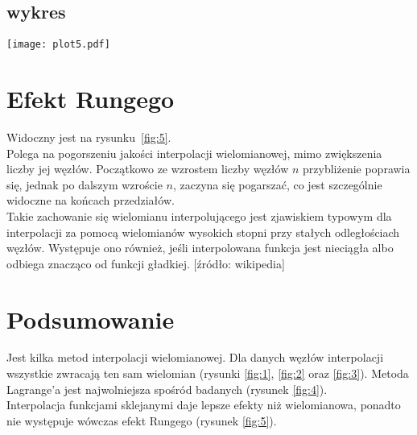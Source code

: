 \subsection{\bf wykres}
\begin{center}
    \texttt{[image: plot5.pdf]}
    \label{fig:5}
\end{center}

\section{\bf Efekt Rungego}
\noindent Widoczny jest na rysunku~\ref{fig:5}.\\
Polega na pogorszeniu jakości interpolacji wielomianowej, mimo 
zwiększenia liczby jej węzłów. Początkowo ze wzrostem liczby węzłów 
$n$ przybliżenie poprawia się, jednak po dalszym wzroście $n$, zaczyna 
się pogarszać, co jest szczególnie widoczne na końcach przedziałów.\\
Takie zachowanie się wielomianu interpolującego jest zjawiskiem typowym 
dla interpolacji za pomocą wielomianów wysokich stopni przy stałych 
odległościach węzłów. Występuje ono również, jeśli interpolowana funkcja
jest nieciągła albo odbiega znacząco od funkcji gładkiej. [źródło: wikipedia]
\clearpage
\section{\bf Podsumowanie}
\noindent Jest kilka metod interpolacji wielomianowej. Dla danych węzłów
interpolacji wszystkie zwracają ten sam wielomian 
(rysunki \ref{fig:1}, \ref{fig:2} oraz \ref{fig:3}).
Metoda Lagrange'a jest najwolniejsza spośród badanych 
(rysunek \ref{fig:4}).\\
Interpolacja funkcjami sklejanymi daje lepsze efekty niż wielomianowa,
ponadto nie występuje wówczas efekt Rungego (rysunek \ref{fig:5}).
\vspace{2cm}

\tableofcontents

